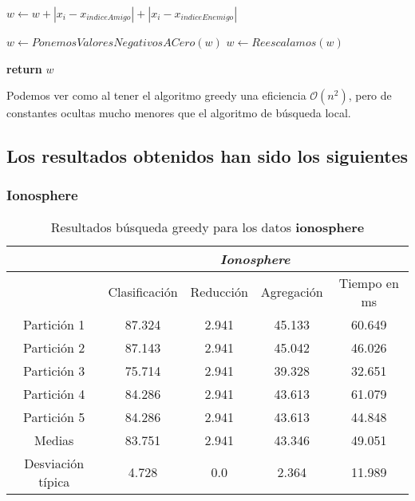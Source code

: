 \begin{algorithm}[H]
\begin{algorithmic}[1]
            \State $w \gets w + |x_i - x_{indiceAmigo}| + |x_i - x_{indiceEnemigo}|$
        \EndFor
        
        \State $w \gets PonemosValoresNegativosACero(w)$
        \State $w \gets Reescalamos(w)$
    \EndFor

    \State \textbf{return} $w$
      \EndProcedure
    \end{algorithmic}
  \end{algorithm}

  Podemos ver como al tener el algoritmo greedy 
una eficiencia $\mathcal{O}(n^2)$, pero de constantes ocultas mucho menores que el algoritmo de búsqueda local. 

\subsection{Los resultados obtenidos han sido los siguientes}


\subsubsection{Ionosphere} 

\begin{table}[H]
  \centering
  \begin{tabular}{|c|c|c|c|c|}
    \hline
    & \multicolumn{4}{|c|}{\textit{Ionosphere}}  \\
    \hline
    &	Clasificación &		Reducción	
    &	Agregación	&	Tiempo en ms \\
    \hline
    Partición 1	&  87.324  &  2.941  &  45.133  &  60.649  \\
    Partición 2 &	 87.143  &  2.941  &  45.042  &  46.026  \\
    Partición 3 &  75.714  &  2.941  &  39.328  &  32.651  \\
    Partición 4	&  84.286  &  2.941  &  43.613  &  61.079 \\
    Partición 5	&  84.286  &  2.941  &  43.613  &  44.848  \\
    \hline
    Medias 	 &  83.751  &  2.941  &  43.346  &  49.051 \\
    \hline
    Desviación típica &	 4.728  &  0.0  &  2.364  &  11.989  \\ 
    \hline  
  \end{tabular}
  \caption{Resultados búsqueda greedy para los datos \textbf{ionosphere}}
  \label{table:greedy_ionosphere}
\end{table}

